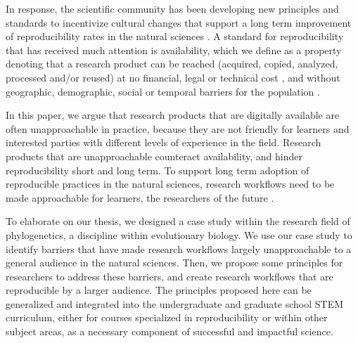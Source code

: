 \documentclass[12pt]{article}
\begin{document}
In response, the scientific community has been developing new principles and standards to incentivize cultural changes that support a long term improvement of reproducibility rates in the natural sciences \citep{peng2015reproducibility, wilkinson2016fair, miyakawa2020no}.
A standard for reproducibility that has received much attention is availability, which we define as a property denoting that a research product can be reached (acquired, copied, analyzed, processed and/or reused) at no financial, legal or technical cost \citep{arnold2019turing}, and without geographic, demographic, social or temporal barriers for the population \citep{fecher2014open}.

In this paper, we argue that research products that are digitally available are often unapproachable in practice, because they are not friendly for learners and interested parties with different levels of experience in the field.
Research products that are unapproachable counteract availability, and hinder reproducibility short and long term.
To support long term adoption of reproducible practices in the natural sciences, research workflows need to be made approachable for learners, the researchers of the future \citep{roland2002think, nasem2018data}.

To elaborate on our thesis, we designed a case study within the research field of phylogenetics, a discipline within evolutionary biology.
We use our case study to identify barriers that have made research workflows largely unapproachable to a general audience in the natural sciences.
Then, we propose some principles for researchers to address these barriers, and create research workflows that are reproducible by a larger audience.
The principles proposed here can be generalized and integrated into the undergraduate and graduate school STEM curriculum, either for courses specialized in reproducibility or within other subject areas, as a necessary component of successful and impactful science.
\end{document}
